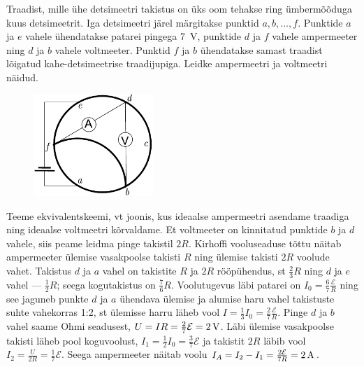 
Traadist, mille ühe detsimeetri takistus on üks oom tehakse ring ümbermõõduga kuus detsimeetrit. Iga detsimeetri järel märgitakse punktid $a, b, \ldots, f$. Punktide $a$ ja $e$ vahele ühendatakse patarei pingega \SI{7}{V}, punktide $d$ ja $f$ vahele ampermeeter ning $d$ ja $b$ vahele voltmeeter. Punktid $f$ ja $b$ ühendatakse samast traadist lõigatud kahe-detsimeetrise traadijupiga. Leidke ampermeetri ja voltmeetri näidud.




\hint

\solu
\begin{figure}
	\vspace{-30pt}
	\begin{center}
		\includegraphics[width = 0.4\textwidth]{2018-lahg-03-yl.pdf}
	\end{center}
\end{figure}

Teeme ekvivalentskeemi, vt joonis, kus ideaalse ampermeetri asendame traadiga ning ideaalse voltmeetri kõrvaldame. Et voltmeeter on kinnitatud punktide $b$ ja $d$ vahele, siis peame leidma pinge takistil $2R$. Kirhoffi vooluseaduse tõttu näitab ampermeeter ülemise vasakpoolse takisti $R$ ning ülemise takisti $2R$ voolude vahet. Takistus $d$ ja $a$ vahel on takistite $R$ ja $2R$ rööpühendus, st $\frac 23R$ ning $d$ ja $e$ vahel --- $\frac 12R$; seega kogutakistus on $\frac 76R$. Voolutugevus läbi patarei on $I_0=\frac 67\frac{\mathcal E}R$ ning see jaguneb punkte $d$ ja $a$ ühendava ülemise ja alumise haru vahel takistuste suhte vahekorras 1:2, st ülemisse harru läheb vool $I=\frac 13I_0=\frac 27\frac{\mathcal E}R$. Pinge $d$ ja $b$ vahel saame Ohmi seadusest, $U=IR=\frac 27\mathcal E=\SI 2V$. Läbi ülemise vasakpoolse takisti läheb pool koguvoolust, $I_1=\frac 12 I_0=\frac 37\mathcal E$ ja takistit $2R$ läbib vool $I_2=\frac U{2R}= \frac 17\mathcal E$. Seega ampermeeter näitab voolu $I_A=I_2-I_1=\frac{2\mathcal E}{7R}=\SI 2A$.
\probend